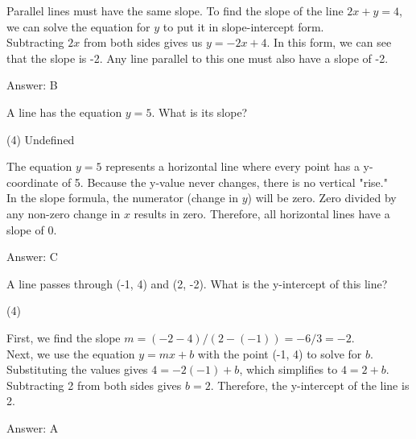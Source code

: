 \documentclass[11pt,paper=a4,answers]{exam}
\begin{document}
\begin{questions}
\begin{solution}
Parallel lines must have the same slope. To find the slope of the line $2x + y = 4$, we can solve the equation for $y$ to put it in slope-intercept form.
\\[10pt]
Subtracting $2x$ from both sides gives us $y = -2x + 4$. In this form, we can see that the slope is -2. Any line parallel to this one must also have a slope of -2.

\vspace{15pt}
Answer: \colorbox{yellow!100}{B}
\end{solution}

\question
A line has the equation $y = 5$. What is its slope?
\begin{tasks}(4)
    \task Undefined
\end{tasks}

\begin{solution}
The equation $y = 5$ represents a horizontal line where every point has a y-coordinate of 5. Because the y-value never changes, there is no vertical "rise."
\\[10pt]
In the slope formula, the numerator (change in $y$) will be zero. Zero divided by any non-zero change in $x$ results in zero. Therefore, all horizontal lines have a slope of 0.

\vspace{15pt}
Answer: \colorbox{yellow!100}{C}
\end{solution}

\question
A line passes through (-1, 4) and (2, -2). What is the y-intercept of this line?
\begin{tasks}(4)
\end{tasks}

\begin{solution}
First, we find the slope $m = (-2 - 4) / (2 - (-1)) = -6 / 3 = -2$.
\\[10pt]
Next, we use the equation $y = mx + b$ with the point (-1, 4) to solve for $b$. Substituting the values gives $4 = -2(-1) + b$, which simplifies to $4 = 2 + b$.
\\[10pt]
Subtracting 2 from both sides gives $b = 2$. Therefore, the y-intercept of the line is 2.

\vspace{15pt}
Answer: \colorbox{yellow!100}{A}
\end{solution}


\end{questions}
\end{document}
